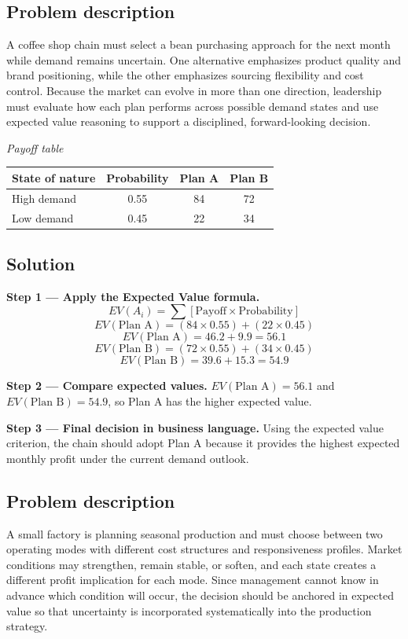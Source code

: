 \begin{ExamProblems}
		\item
		\subsection*{Problem description}
		A coffee shop chain must select a bean purchasing approach for the next month while demand remains uncertain. One alternative emphasizes product quality and brand positioning, while the other emphasizes sourcing flexibility and cost control. Because the market can evolve in more than one direction, leadership must evaluate how each plan performs across possible demand states and use expected value reasoning to support a disciplined, forward-looking decision.

		\begin{center}
			\textit{Payoff table} \par
			\begin{tabular}{l c c c}
				\toprule
				State of nature & Probability & Plan A & Plan B \\
				\midrule
				High demand & 0.55 & 84 & 72 \\
				Low demand & 0.45 & 22 & 34 \\
				\bottomrule
			\end{tabular}
		\end{center}

		\subsection*{Solution}
		\textbf{Step 1 --- Apply the Expected Value formula.}
		\[
		EV(A_i)=\sum [\text{Payoff}\times\text{Probability}]
		\]
		\[
		EV(\text{Plan A})=(84\times0.55)+(22\times0.45)
		\]
		\[
		EV(\text{Plan A})=46.2+9.9=56.1
		\]
		\[
		EV(\text{Plan B})=(72\times0.55)+(34\times0.45)
		\]
		\[
		EV(\text{Plan B})=39.6+15.3=54.9
		\]
		
		\textbf{Step 2 --- Compare expected values.}
		$EV(\text{Plan A})=56.1$ and $EV(\text{Plan B})=54.9$, so Plan A has the higher expected value.
		
		\textbf{Step 3 --- Final decision in business language.}
		Using the expected value criterion, the chain should adopt Plan A because it provides the highest expected monthly profit under the current demand outlook.
		
		\item
		\subsection*{Problem description}
		A small factory is planning seasonal production and must choose between two operating modes with different cost structures and responsiveness profiles. Market conditions may strengthen, remain stable, or soften, and each state creates a different profit implication for each mode. Since management cannot know in advance which condition will occur, the decision should be anchored in expected value so that uncertainty is incorporated systematically into the production strategy.


\end{ExamProblems}
